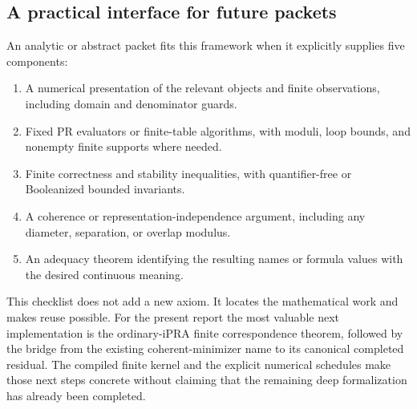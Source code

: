\subsection{A practical interface for future packets}

An analytic or abstract packet fits this framework when it explicitly supplies five components:
\begin{enumerate}
\item A numerical presentation of the relevant objects and finite observations, including domain and denominator guards.
\item Fixed PR evaluators or finite-table algorithms, with moduli, loop bounds, and nonempty finite supports where needed.
\item Finite correctness and stability inequalities, with quantifier-free or Booleanized bounded invariants.
\item A coherence or representation-independence argument, including any diameter, separation, or overlap modulus.
\item An adequacy theorem identifying the resulting names or formula values with the desired continuous meaning.
\end{enumerate}

This checklist does not add a new axiom. It locates the mathematical work and makes reuse possible. For the present report the most valuable next implementation is the ordinary-iPRA finite correspondence theorem, followed by the bridge from the existing coherent-minimizer name to its canonical completed residual. The compiled finite kernel and the explicit numerical schedules make those next steps concrete without claiming that the remaining deep formalization has already been completed.
